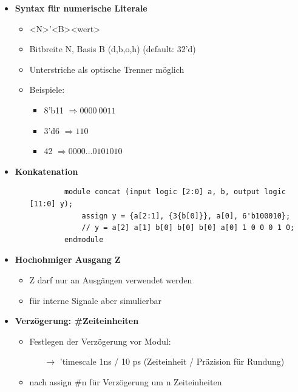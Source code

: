 \documentclass[11pt,a4paper]{article}
\begin{document}
\begin{itemize}
\item \textbf{Syntax für numerische Literale}
	\begin{itemize}
	\item <N>'<B><wert>
	\item Bitbreite N, Basis B (d,b,o,h) (default: 32'd)
	\item Unterstriche als optische Trenner möglich
	\item Beispiele:
		\begin{itemize}
		\item 8'b11 $\Rightarrow 0000~0011$
		\item 3'd6 $\Rightarrow 110$
		\item 42 $\Rightarrow 0000...0101010$
		\end{itemize}
	\end{itemize}

\item \textbf{Konkatenation}
	\begin{itemize}
	
	\item[]
		\begin{lstlisting}
		module concat (input logic [2:0] a, b, output logic [11:0] y);
			assign y = {a[2:1], {3{b[0]}}, a[0], 6'b100010};
			// y = a[2] a[1] b[0] b[0] b[0] a[0] 1 0 0 0 1 0;
		endmodule		
		\end{lstlisting}
	
	\end{itemize}
	
\item \textbf{Hochohmiger Ausgang Z}
	\begin{itemize}
	\item Z darf nur an Ausgängen verwendet werden
	\item für interne Signale aber simulierbar
	\end{itemize}

\item \textbf{Verzögerung: \#Zeiteinheiten}
	\begin{itemize}
	\item Festlegen der Verzögerung vor Modul: 
		\begin{itemize}
		\item[$\rightarrow$]'timescale 1ns / 10 ps (Zeiteinheit / Präzision für Rundung)
		\end{itemize}
	\item nach assign \#n für Verzögerung um n Zeiteinheiten
	\end{itemize}

\end{itemize}
\end{document}
